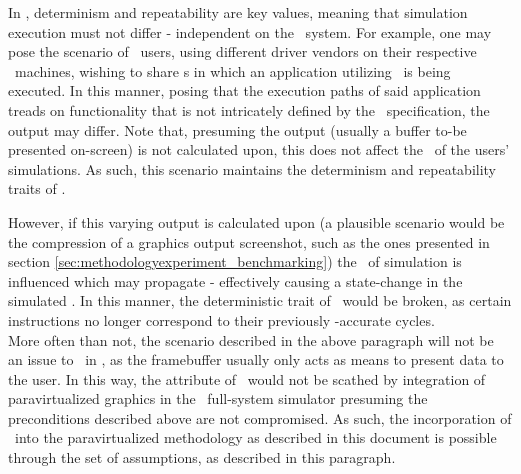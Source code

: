 In \dvttermsimics , determinism and repeatability are key values, meaning that simulation execution must not differ - independent on the \dvttermhost\ system.
For example, one may pose the scenario of \dvttermsimics\ users, using different driver vendors on their respective \dvttermhost\ machines, wishing to share \dvttermcheckpoint s in which an application utilizing \dvttermopengles\ is being executed.
In this manner, posing that the execution paths of said application treads on functionality that is not intricately defined by the \dvttermopengles\ specification, the output may differ.
Note that, presuming the output (usually a buffer to-be presented on-screen) is not calculated upon, this does not affect the \dvttermtiming\ of the users' simulations.
As such, this scenario maintains the determinism and repeatability traits of \dvttermsimics .

However, if this varying output is calculated upon (a plausible scenario would be the compression of a graphics output screenshot, such as the ones presented in section \ref{sec:methodologyexperiment_benchmarking}) the \dvttermtiming\ of simulation is influenced which may propagate - effectively causing a state-change in the simulated \dvttermcpu .
In this manner, the deterministic trait of \dvttermsimics\ would be broken, as certain instructions no longer correspond to their previously \dvttermtiming -accurate cycles.\\

\noindent
More often than not, the scenario described in the above paragraph will not be an issue to \dvttermdeterministicexecution\ in \dvttermsimics , as the framebuffer usually only acts as means to present data to the user.
In this way, the attribute of \dvttermdeterministicexecution\ would not be scathed by integration of paravirtualized graphics in the \dvttermsimics\ full-system simulator presuming the preconditions described above are not compromised.
As such, the incorporation of \dvttermdeterministicexecution\ into the paravirtualized methodology as described in this document is possible through the set of assumptions, as described in this paragraph.

